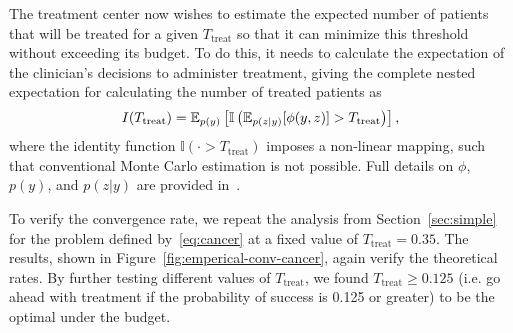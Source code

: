 The treatment center now wishes to estimate the expected number of patients that will be treated for a given $T_{\mathrm{treat}}$ so that it can minimize this threshold without exceeding its budget.
To do this, it needs to calculate the expectation of the clinician's decisions to administer 
treatment, giving the complete nested expectation for calculating the number of treated patients as
\begin{equation}
	\label{eq:cancer}
I(T_{\mathrm{treat}}) = \mathbb{E}_{p(y)} \left[\mathbb{I}\left(\mathbb{E}_{p(z|y)} [\phi(y,z)]>T_{\mathrm{treat}}\right)\right],
\end{equation}
where the identity function $\mathbb{I}(\cdot > T_{\mathrm{treat}})$ imposes a non-linear
mapping, such that conventional Monte Carlo estimation is not possible. Full details on $\phi$, $p(y)$, and $p(z|y)$ are 
provided in~\cite{rainforth2017pitfalls}.

To verify the convergence rate, we repeat the analysis from Section~\ref{sec:simple} for the problem defined 
by~\eqref{eq:cancer} at a fixed value of $T_{\mathrm{treat}}=0.35$. 
The results, shown in Figure~\ref{fig:emperical-conv-cancer}, again verify the theoretical rates. 
By further testing different values of $T_{\mathrm{treat}}$, we found $T_{\mathrm{treat}} \ge 0.125$ (i.e.
go ahead with treatment if the probability of success is 0.125 or greater) to be the optimal under the budget.